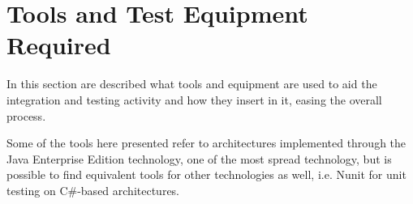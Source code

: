 \section{Tools and Test Equipment Required}

In this section are described what tools and equipment are used to aid the integration and testing activity and how they insert in it, easing the overall process.

Some of the tools here presented refer to architectures implemented through the Java Enterprise Edition technology, one of the most spread technology, but is possible to find equivalent tools for other technologies as well, i.e. Nunit for unit testing on C\#-based architectures.

	
	
